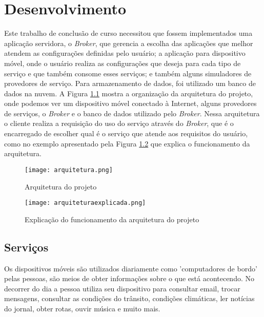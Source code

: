 \chapter{Desenvolvimento}\label{cha:desenvolvimento}
Este trabalho de conclusão de curso necessitou que fossem implementados uma aplicação servidora, o \textit{Broker}, que gerencia a escolha das aplicações que melhor atendem as configurações definidas pelo usuário; a aplicação para dispositivo móvel, onde o usuário realiza as configurações que deseja para cada tipo de serviço e que também consome esses serviços; e também alguns simuladores de provedores de serviço. Para armazenamento de dados, foi utilizado um banco de dados na nuvem. A Figura \ref{fig:arquitetura} mostra a organização da arquitetura do projeto, onde podemos ver um dispositivo móvel conectado à Internet, alguns provedores de serviços, o \textit{Broker} e o banco de dados utilizado pelo \textit{Broker}.
Nessa arquitetura o cliente realiza a requisição do uso do serviço através do \textit{Broker}, que é o encarregado de escolher qual é o serviço que atende aos requisitos do usuário, como no exemplo apresentado pela Figura \ref{fig:arquiteturaexplicada} que explica o funcionamento da arquitetura.

\begin{figure}[!htb]
  \centering
  \texttt{[image: arquitetura.png]} %
  \caption[Arquitetura do projeto]{Arquitetura do projeto}
  \label{fig:arquitetura}
\end{figure}

\begin{figure}[!htb]
  \centering
  \texttt{[image: arquiteturaexplicada.png]} %
  \caption[Explicação do funcionamento da arquitetura do projeto]{Explicação do funcionamento da arquitetura do projeto}
  \label{fig:arquiteturaexplicada}
\end{figure}

\section{Serviços}
Os dispositivos móveis são utilizados diariamente como 'computadores de bordo' pelas pessoas, são meios de obter informações sobre o que está acontecendo. No decorrer do dia a pessoa utiliza seu dispositivo para consultar email, trocar mensagens, consultar as condições do trânsito, condições climáticas, ler notícias do jornal, obter rotas, ouvir música e muito mais.

